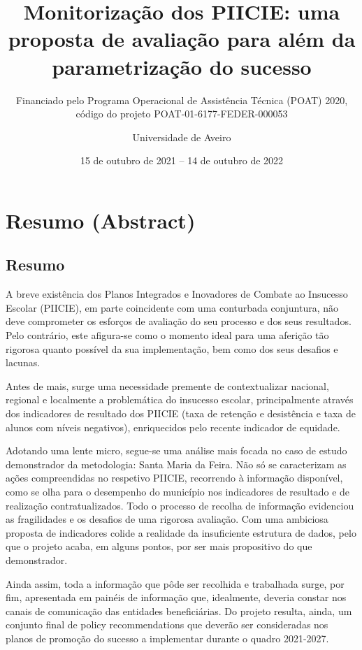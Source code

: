 \documentclass[
]{book}
\title{Monitorização dos PIICIE: uma proposta de avaliação para além da parametrização do sucesso}
\subtitle{Financiado pelo Programa Operacional de Assistência Técnica (POAT) 2020, código do projeto POAT-01-6177-FEDER-000053}
\author{Universidade de Aveiro}
\date{15 de outubro de 2021 -- 14 de outubro de 2022}
\begin{document}
\maketitle

{
\setcounter{tocdepth}{1}
\tableofcontents
}
\hypertarget{resumo-abstract}{%
\chapter{Resumo (Abstract)}\label{resumo-abstract}}

\hypertarget{resumo}{%
\section{\texorpdfstring{\textbf{Resumo}}{Resumo}}\label{resumo}}

A breve existência dos Planos Integrados e Inovadores de Combate ao Insucesso Escolar (PIICIE), em parte coincidente com uma conturbada conjuntura, não deve comprometer os esforços de avaliação do seu processo e dos seus resultados. Pelo contrário, este afigura-se como o momento ideal para uma aferição tão rigorosa quanto possível da sua implementação, bem como dos seus desafios e lacunas.

Antes de mais, surge uma necessidade premente de contextualizar nacional, regional e localmente a problemática do insucesso escolar, principalmente através dos indicadores de resultado dos PIICIE (taxa de retenção e desistência e taxa de alunos com níveis negativos), enriquecidos pelo recente indicador de equidade.

Adotando uma lente micro, segue-se uma análise mais focada no caso de estudo demonstrador da metodologia: Santa Maria da Feira. Não só se caracterizam as ações compreendidas no respetivo PIICIE, recorrendo à informação disponível, como se olha para o desempenho do município nos indicadores de resultado e de realização contratualizados. Todo o processo de recolha de informação evidenciou as fragilidades e os desafios de uma rigorosa avaliação. Com uma ambiciosa proposta de indicadores colide a realidade da insuficiente estrutura de dados, pelo que o projeto acaba, em alguns pontos, por ser mais propositivo do que demonstrador.

Ainda assim, toda a informação que pôde ser recolhida e trabalhada surge, por fim, apresentada em painéis de informação que, idealmente, deveria constar nos canais de comunicação das entidades beneficiárias. Do projeto resulta, ainda, um conjunto final de policy recommendations que deverão ser consideradas nos planos de promoção do sucesso a implementar durante o quadro 2021-2027.
\end{document}
